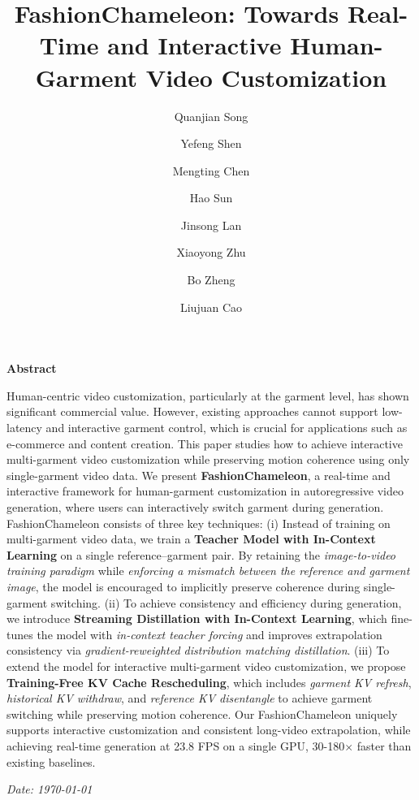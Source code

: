 \documentclass{llmxive}
\title{FashionChameleon: Towards Real-Time and Interactive Human-Garment Video Customization}
\author{Quanjian Song \and Yefeng Shen \and Mengting Chen \and Hao Sun \and Jinsong Lan \and Xiaoyong Zhu \and Bo Zheng \and Liujuan Cao}
\providecommand{\method}{FashionChameleon\xspace}
\begin{document}
\maketitle
%
\newenvironment{customabstract}{
    \begin{tcolorbox}[
        enhanced,
        colframe=taobaocolor,
        colback=white,
        boxrule=0.7pt,
        arc=12pt,
        auto outer arc,
        left=15pt,
        right=15pt,
        top=10pt,
        bottom=15pt,
        breakable
    ]
    \begin{center}
        \Large\bfseries Abstract
    \end{center}
    \vspace{0.2em}
}{
    \par\vspace{1em}
    \hfill \textit{Date: \today} %
    \end{tcolorbox}
}

\begin{customabstract}
%
Human-centric video customization, particularly at the garment level, has shown significant commercial value. However, existing approaches cannot support low-latency and interactive garment control, which is crucial for applications such as e-commerce and content creation.
% 
This paper studies how to achieve interactive multi-garment video customization while preserving motion coherence using only single-garment video data.
% 
We present \textbf{\method}, a real-time and interactive framework for human-garment customization in autoregressive video generation, where users can interactively switch garment during generation.
\method consists of three key techniques:
% 
(i) Instead of training on multi-garment video data, we train a \textbf{Teacher Model with In-Context Learning} on a single reference–garment pair. By retaining the \textit{image-to-video training paradigm} while \textit{enforcing a mismatch between the reference and garment image}, the model is encouraged to implicitly preserve coherence during single-garment switching.
% 
(ii) To achieve consistency and efficiency during generation, we introduce \textbf{Streaming Distillation with In-Context Learning}, which fine-tunes the model with \textit{in-context teacher forcing} and improves extrapolation consistency via \textit{gradient-reweighted distribution matching distillation}.
% 
(iii) To extend the model for interactive multi-garment video customization, we propose \textbf{Training-Free KV Cache Rescheduling}, which includes \textit{garment KV refresh}, \textit{historical KV withdraw}, and \textit{reference KV disentangle} to achieve garment switching while preserving motion coherence.
% 
Our \method uniquely supports interactive customization and consistent long-video extrapolation, while achieving real-time generation at 23.8 FPS on a single GPU, 30-180$\times$ faster than existing baselines.
% 
\end{customabstract}
\end{document}
